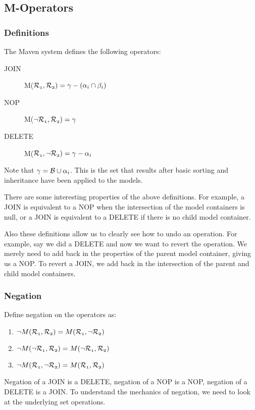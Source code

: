 \documentclass[12pt]{amsart}
\begin{document}
\subsection{M-Operators}
\subsubsection{Definitions}
The Maven system defines the following operators:
\begin{description}
\item[JOIN]  M($\mathnormal{\mathcal{R}_{1},\mathcal{R}_{2} ) = \gamma - (\alpha_i \cap \beta_i)}$
\item[NOP] M($\mathnormal{\neg \mathcal{R}_{1}, \mathcal{R}_{2})  = \gamma} $ 
\item[DELETE] M($\mathnormal{\mathcal{R}_{1}, \neg \mathcal{R}_{2}) =  \gamma -\alpha_i} $ 
\end{description}
Note that $\mathnormal{\gamma=\mathcal{B}\cup \alpha_i}$. This is the set that results after basic sorting and inheritance have been applied to the models. 

There are some interesting properties of the above definitions. For example,  a JOIN is equivalent to a NOP when the intersection of the model containers is null, or a JOIN is equivalent to a DELETE if there is no child model container.

Also these definitions allow us to clearly see how to undo an operation. For example, say we did a DELETE and now we want to revert the operation. We merely need to add back in the properties of the parent model container, giving us a NOP. To revert a JOIN, we add back in the intersection of the parent and child model containers.

\subsubsection{Negation}
Define negation on the operators as:
\begin{enumerate}
\item $\mathnormal{\neg M(\mathcal{R}_{1},\mathcal{R}_{2} ) =M(\mathcal{R}_{1},\neg \mathcal{R}_{2} ) }$
\item $\mathnormal{\neg M(\neg \mathcal{R}_{1},\mathcal{R}_{2} ) =M(\neg \mathcal{R}_{1}, \mathcal{R}_{2} ) }$
\item $\mathnormal{\neg M(\mathcal{R}_{1}, \neg \mathcal{R}_{2}) =  M(\mathcal{R}_{1},\mathcal{R}_{2} )} $ 
\end{enumerate}
Negation of a JOIN is a DELETE, negation of a NOP is a NOP, negation of a DELETE is a JOIN. To understand the mechanics of negation, we need to look at the underlying set operations. 
\end{document}
